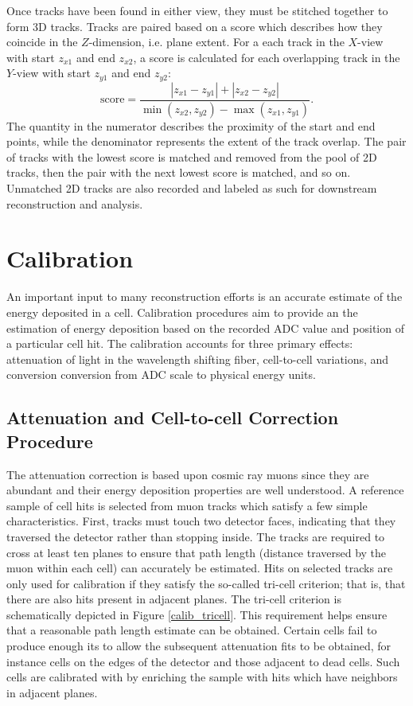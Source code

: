 Once tracks have been found in either view, they must be stitched together
to form 3D tracks.  Tracks are paired based on a score which describes how
they coincide in the $Z$-dimension, i.e. plane extent.
For a each track in the $X$-view with start $z_{x1}$ and end $z_{x2}$, a score
is calculated for each overlapping track in the $Y$-view with start
$z_{y1}$ and end $z_{y2}$:
\begin{equation}
\text{score} = \frac{|z_{x1}  - z_{y1} | + |z_{x2} - z_{y2}|}{\min(z_{x2}, z_{y2}) - \max(z_{x1},z_{y1} )}.
\end{equation}
The quantity in the numerator describes the proximity of the start and end
points, while the denominator represents the extent of the track overlap.
The pair of tracks with the lowest score is matched and removed from the pool
of 2D tracks, then the pair with the next lowest score is matched, and so on.
Unmatched 2D tracks are also recorded and labeled as such for downstream
reconstruction and analysis.

\section{Calibration}

An important input to many reconstruction efforts is an accurate estimate of
the energy deposited in a cell.  Calibration procedures aim to provide an the
estimation of energy deposition based on the recorded ADC value and position
of a particular cell hit.  The \nova calibration accounts for three primary
effects: attenuation
of light in the wavelength shifting fiber, cell-to-cell variations, and
conversion conversion from ADC scale to physical energy units.

\subsection{Attenuation and Cell-to-cell Correction Procedure}

The attenuation correction is based upon cosmic ray muons since they are
abundant and their energy deposition properties are well understood.  A
reference sample of cell hits is selected from muon tracks which satisfy a few
simple characteristics.  First, tracks must touch two detector faces,
indicating that they traversed the detector rather than stopping inside.  The
tracks are required to cross at least ten planes to ensure that path length
(distance traversed by the muon within each cell) can accurately be estimated.
Hits on selected tracks are only used for calibration if they satisfy the
so-called tri-cell criterion; that is, that there are also hits present in
adjacent planes.
The tri-cell criterion is schematically depicted in Figure \ref{calib_tricell}.
This requirement helps ensure that a reasonable path
length estimate can be obtained.
Certain cells fail to produce enough its to allow
the subsequent attenuation fits to be obtained, for instance cells on the edges
of the detector and those adjacent to dead cells.  Such cells are calibrated
with by enriching the sample with hits which have neighbors in adjacent planes.


